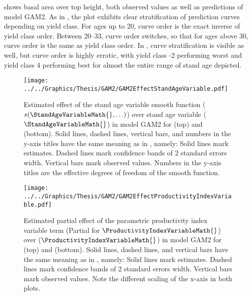  shows basal area over top height, both observed values as well as predictions of model GAM2.  As in , the \Beech{} plot exhibits clear stratification of prediction curves depending on yield class.  For ages up to \SI{20}{\year}, curve order is the exact inverse of yield class order. Between \SIrange{20}{33}{\year}, curve order switches, so that for ages above \SI{30}{\year}, curve order is the same as yield class order.  In \Spruce{}, curve stratification is visible as well, but curve order is highly erratic, with yield class -2 performing worst and yield class 4 performing best for almost the entire range of stand age depicted.

\begin{figure}[h]
  \centering
  \texttt{[image: ../../Graphics/Thesis/GAM2/GAM2EffectStandAgeVariable.pdf]}
  \caption{Estimated effect of the stand age variable smooth function (\(s(\StandAgeVariableMath{}, \ldots)\)) over stand age variable (\(\StandAgeVariableMath{}\)) in model GAM2 for \Beech{} (top) and \Spruce{} (bottom).   Solid lines, dashed lines, vertical bars, and numbers in the y-axis titles have the same meaning as in , namely:  Solid lines mark estimates.  Dashed lines mark confidence bands of 2 standard errors width.  Vertical bars mark observed values.  Numbers in the y-axis titles are the effective degrees of freedom of the smooth function.}
  \label{fig:GAM2EffectStandAgeVariable}
\end{figure}

\begin{figure}[h]
  \centering
  \texttt{[image: ../../Graphics/Thesis/GAM2/GAM2EffectProductivityIndexVariable.pdf]}
  \caption{Estimated partial effect of the parametric productivity index variable term (Partial for \(\ProductivityIndexVariableMath{}\)) over \ProductivityIndexVariableText{} (\(\ProductivityIndexVariableMath{}\)) in model GAM2 for \Beech{} (top) and \Spruce{} (bottom).   Solid lines, dashed lines, and vertical bars have the same meaning as in , namely:  Solid lines mark estimates.  Dashed lines mark confidence bands of 2 standard errors width.  Vertical bars mark observed values.  Note the different scaling of the x-axis in both plots.}
  \label{fig:GAM2EffectProductivityIndexVariable}
\end{figure}

